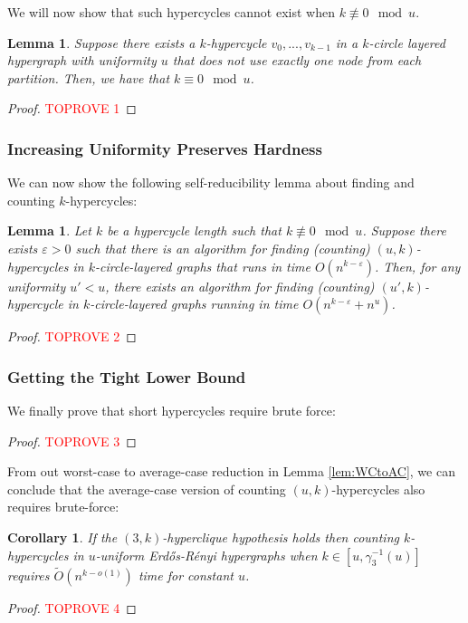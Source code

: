 \documentclass[11pt,letterpaper,pdftex]{article}
\newtheorem{lemma}[theorem]{Lemma}
\newtheorem{corollary}[theorem]{Corollary}
\begin{document}
We will now show that such hypercycles cannot exist when $k \not\equiv 0 \mod{u}$.

\begin{lemma}\label{lem:no_short_backward_cycles}
Suppose there exists a $k$-hypercycle $v_0,...,v_{k-1}$ in a $k$-circle layered hypergraph with uniformity $u$ that does not use exactly one node from each partition. Then, we have that $k\equiv 0 \mod{u}$.
\end{lemma}
\begin{proof}\textcolor{red}{TOPROVE 1}\end{proof}

\subsubsection{Increasing Uniformity Preserves Hardness}

We can now show the following self-reducibility lemma about finding and counting $k$-hypercycles:

\begin{lemma} \label{lem:uniform self reduction}
    Let $k$ be a hypercycle length such that $k \not \equiv 0 \mod{u}$.
    Suppose there exists $\varepsilon>0$ such that there is an algorithm for finding (counting) $(u,k)$-hypercycles in $k$-circle-layered graphs that runs in time $O(n^{k-\varepsilon})$.
    Then, for any uniformity $u'<u$, there exists an algorithm for finding (counting) $(u',k)$-hypercycle in $k$-circle-layered graphs running in time $O(n^{k-\varepsilon}+n^u)$.
\end{lemma}
\begin{proof}\textcolor{red}{TOPROVE 2}\end{proof}

\subsubsection{Getting the Tight Lower Bound}

We finally prove that short hypercycles require brute force:

\tightShortHypercycle*
\begin{proof}\textcolor{red}{TOPROVE 3}\end{proof}

From out worst-case to average-case reduction in Lemma \ref{lem:WCtoAC}, we can conclude that the average-case version of counting $(u,k)$-hypercycles also requires brute-force:

\begin{corollary}
    If the $(3,k)$-hyperclique hypothesis holds then counting $k$-hypercycles in $u$-uniform Erd{\H{o}}s-R{\'{e}}nyi hypergraphs when $k \in [u, \gamma_3^{-1}(u)]$ requires $\tilde{O}(n^{k-o(1)})$ time for constant $u$.
\end{corollary}
\begin{proof}\textcolor{red}{TOPROVE 4}\end{proof} 
\end{document}
